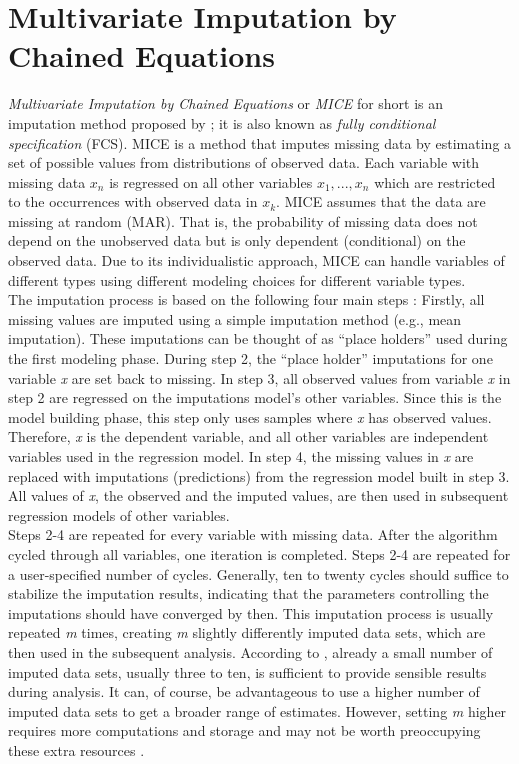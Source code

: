 \section{Multivariate Imputation by Chained Equations}
\textit{Multivariate Imputation by Chained Equations} or \textit{MICE} for 
short is an imputation method proposed by \citeauthor{RN135} \cite{RN135}; it 
is also known as \textit{fully conditional specification} (FCS).
MICE is a method that imputes missing data by estimating a set of possible 
values from distributions of observed data. Each variable with missing data 
$x_n$ is regressed on all other variables $x_1, ..., x_n$ which are restricted 
to the occurrences with observed data in $x_k$.
MICE assumes that the data are missing at random (MAR). That is, the 
probability 
of missing data does not depend on the unobserved data but is only 
dependent (conditional) on the observed data. Due to its individualistic 
approach, MICE can handle variables of different types using different 
modeling choices for different variable types.
\\
The imputation process is based on the following four main steps \cite{RN142, 
RN141}: Firstly, all missing values are imputed using a simple imputation 
method (e.g., mean imputation). These imputations can be thought of as ``place 
holders'' used during the first modeling phase. During step 2, the ``place 
holder'' imputations for one variable \textit{x} are set back to missing. In 
step 3, all observed values from variable \textit{x} in step 2 are regressed on 
the imputations model's other variables. Since this is the model building 
phase, this step only uses samples where \textit{x} has observed values. 
Therefore, \textit{x} is the dependent variable, and all other variables are 
independent variables used in the regression model. In step 4, the missing 
values in \textit{x} are replaced with imputations (predictions) from the 
regression model built in step 3. All values of \textit{x}, the observed and the 
imputed values, are then used in subsequent regression models of other 
variables.
\\
Steps 2-4 are repeated for every variable with missing data. After the 
algorithm cycled through all variables, one iteration is 
completed. Steps 2-4 are repeated for a user-specified number of cycles. 
Generally, ten to twenty cycles should suffice to stabilize the imputation 
results, indicating that the parameters controlling the imputations should have 
converged by then. This imputation process is usually repeated \textit{m} 
times, creating \textit{m} slightly differently imputed data sets, which are 
then used in the subsequent analysis. According to \cite{RN144, RN141, RN142}, 
already a 
small number of imputed data sets, usually three to ten, is sufficient to 
provide sensible results during analysis. It can, of course, be advantageous 
to use a higher number of imputed data sets to get a broader range of 
estimates. However, setting \textit{m} higher requires more computations and 
storage 
and may not be worth preoccupying these extra resources \cite{RN144}.

